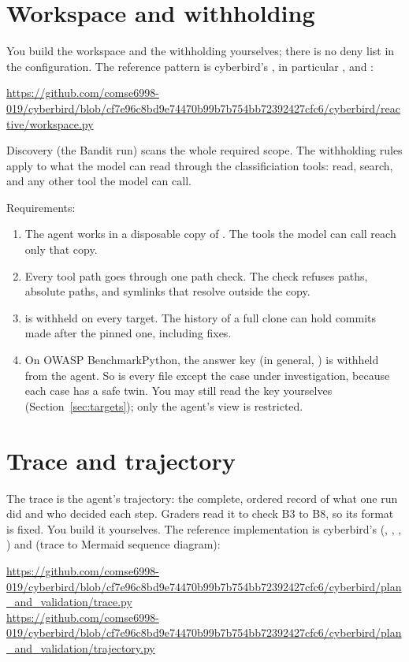 \documentclass[9pt,letterpaper]{article}
\begin{document}
\section{Workspace and withholding}\label{sec:workspace}

You build the workspace and the withholding yourselves; there is no deny list
in the configuration. The reference pattern is cyberbird's
, in particular ,
 and :
{\raggedright\url{https://github.com/comse6998-019/cyberbird/blob/cf7e96c8bd9e74470b99b7b754bb72392427cfc6/cyberbird/reactive/workspace.py}\par}

Discovery (the Bandit run) scans the whole required \code{[scan]} scope. The
withholding rules apply to what the model can read through the classificiation tools:
read, search, and any other tool the model can call.

Requirements:
\begin{enumerate}
\item The agent works in a disposable copy of . The tools the model
  can call reach only that copy.
\item Every tool path goes through one path check. The check refuses 
  paths, absolute paths, and symlinks that resolve outside the copy.
\item {} is withheld on every target. The history of a full clone can
  hold commits made after the pinned one, including fixes.
\item On OWASP BenchmarkPython, the answer key 
  (in general, ) is withheld from the agent. So is
  every  file except the case under investigation, because
  each case has a safe twin. You may still read the key yourselves
  (Section~\ref{sec:targets}); only the agent's view is restricted.
\end{enumerate}

\section{Trace and trajectory}\label{sec:trace}

The trace is the agent's trajectory: the complete, ordered record of what one
run did and who decided each step. Graders read it to check B3 to B8, so its
format is fixed. You build it yourselves. The reference implementation is
cyberbird's  (,
, , ) and
 (trace to Mermaid sequence
diagram):
{\raggedright\url{https://github.com/comse6998-019/cyberbird/blob/cf7e96c8bd9e74470b99b7b754bb72392427cfc6/cyberbird/plan_and_validation/trace.py}\\
\url{https://github.com/comse6998-019/cyberbird/blob/cf7e96c8bd9e74470b99b7b754bb72392427cfc6/cyberbird/plan_and_validation/trajectory.py}\par}
\end{document}
